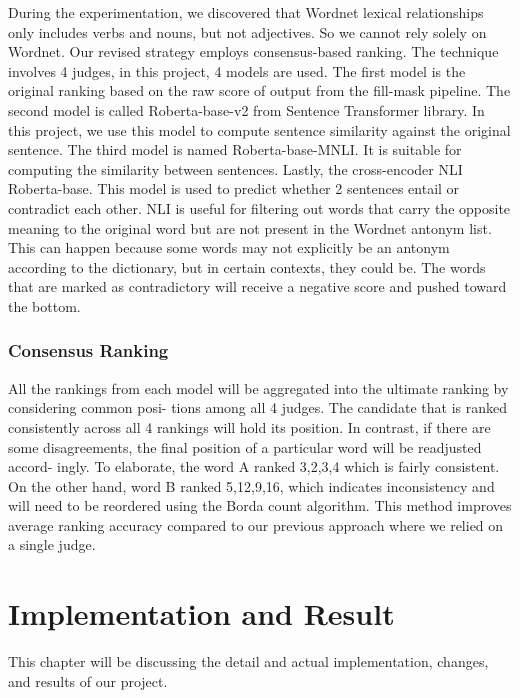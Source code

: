 \documentclass[12pt,oneside,openright,a4paper]{cpe-english-project}
\begin{document}
During the experimentation, we discovered that Wordnet lexical relationships only includes verbs and nouns, but not adjectives. So we cannot rely solely on Wordnet. Our revised strategy employs consensus-based ranking. The technique involves 4 judges, in this project, 4 models are used. The first model is the original ranking based on the raw score of output from the fill-mask pipeline. The second model is called Roberta-base-v2 from Sentence Transformer library. In this project, we use this model to compute sentence similarity against the original sentence. The third model is named Roberta-base-MNLI. It is suitable for computing the similarity between sentences. Lastly, the cross-encoder NLI Roberta-base. This model is used to predict whether 2 sentences entail or contradict each other. NLI is useful for filtering out words that carry the opposite meaning to the original word but are not present in the Wordnet antonym list. This can happen because some words may not explicitly be an antonym according to the dictionary, but in certain contexts, they could be. The words that are marked as contradictory will receive a negative score and pushed toward the bottom. 

\subsection{Consensus Ranking}
All the rankings from each model will be aggregated into the ultimate ranking by considering common posi- tions among all 4 judges. The candidate that is ranked consistently across all 4 rankings will hold its position. In contrast, if there are some disagreements, the final position of a particular word will be readjusted accord- ingly. To elaborate, the word A ranked 3,2,3,4 which is fairly consistent. On the other hand, word B ranked 5,12,9,16, which indicates inconsistency and will need to be reordered using the Borda count algorithm. This method improves average ranking accuracy compared to our previous approach where we relied on a single judge.





\chapter{Implementation and Result}
This chapter will be discussing the detail and actual implementation, changes, and results of our project.
\end{document}
